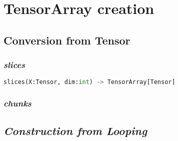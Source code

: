 \section{TensorArray creation}


\subsection{Conversion from Tensor}

\subsubsection{\textbf{\textit{slices}}}

\begin{lstlisting}[language=Python]
slices(X:Tensor, dim:int) -> TensorArray[Tensor]
\end{lstlisting}

\subsubsection{\textbf{\textit{chunks}}}

\subsection{\textbf\textit{Construction from Looping}}
